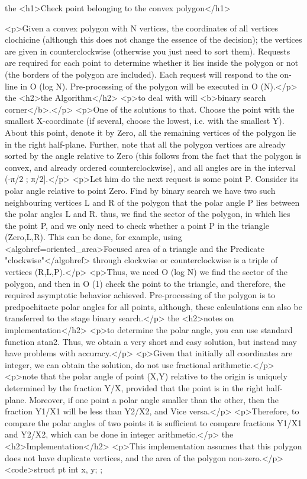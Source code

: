 the <h1>Check point belonging to the convex polygon</h1>

<p>Given a convex polygon with N vertices, the coordinates of all vertices clochicine (although this does not change the essence of the decision); the vertices are given in counterclockwise (otherwise you just need to sort them). Requests are required for each point to determine whether it lies inside the polygon or not (the borders of the polygon are included). Each request will respond to the on-line in O (log N). Pre-processing of the polygon will be executed in O (N).</p>
the <h2>the Algorithm</h2>
<p>to deal with will <b>binary search corner</b>.</p>
<p>One of the solutions to that. Choose the point with the smallest X-coordinate (if several, choose the lowest, i.e. with the smallest Y). About this point, denote it by Zero, all the remaining vertices of the polygon lie in the right half-plane. Further, note that all the polygon vertices are already sorted by the angle relative to Zero (this follows from the fact that the polygon is convex, and already ordered counterclockwise), and all angles are in the interval (-π/2 ; π/2].</p>
<p>Let him do the next request is some point P. Consider its polar angle relative to point Zero. Find by binary search we have two such neighbouring vertices L and R of the polygon that the polar angle P lies between the polar angles L and R. thus, we find the sector of the polygon, in which lies the point P, and we only need to check whether a point P in the triangle (Zero,L,R). This can be done, for example, using <algohref=oriented_area>Focused area of a triangle and the Predicate "clockwise"</algohref> through clockwise or counterclockwise is a triple of vertices (R,L,P).</p>
<p>Thus, we need O (log N) we find the sector of the polygon, and then in O (1) check the point to the triangle, and therefore, the required asymptotic behavior achieved. Pre-processing of the polygon is to predpochitaete polar angles for all points, although, these calculations can also be transferred to the stage binary search.</p>
the <h2>notes on implementation</h2>
<p>to determine the polar angle, you can use standard function atan2. Thus, we obtain a very short and easy solution, but instead may have problems with accuracy.</p>
<p>Given that initially all coordinates are integer, we can obtain the solution, do not use fractional arithmetic.</p>
<p>note that the polar angle of point (X,Y) relative to the origin is uniquely determined by the fraction Y/X, provided that the point is in the right half-plane. Moreover, if one point a polar angle smaller than the other, then the fraction Y1/X1 will be less than Y2/X2, and Vice versa.</p>
<p>Therefore, to compare the polar angles of two points it is sufficient to compare fractions Y1/X1 and Y2/X2, which can be done in integer arithmetic.</p>
the <h2>Implementation</h2>
<p>This implementation assumes that this polygon does not have duplicate vertices, and the area of the polygon non-zero.</p>
<code>struct pt {
int x, y;
};

